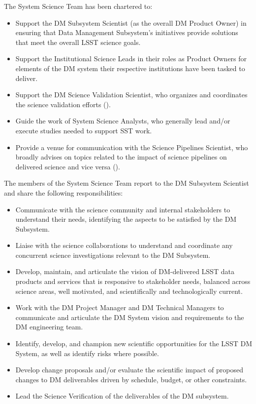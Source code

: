 The System Science Team has been chartered to:
\begin{itemize}
\item Support the DM Subsystem Scientist (as the overall DM Product Owner) in ensuring that Data Management Subsystem's initiatives provide solutions that meet the overall LSST science goals.
\item Support the Institutional Science Leads in their roles as Product Owners for elements of the DM system their respective institutions have been tasked to deliver.
\item Support the DM Science Validation Scientist, who organizes and coordinates the science validation efforts ().
\item Guide the work of System Science Analysts, who generally lead and/or execute studies needed to support SST work.
\item Provide a venue for communication with the Science Pipelines Scientist, who broadly advises on topics related to the impact of science pipelines on delivered science and vice versa ().
\end{itemize}

The members of the System Science Team report to the DM Subsystem Scientist and share the following responsibilities:
\begin{itemize}
\item Communicate with the science community and internal stakeholders to understand their needs, identifying the aspects to be satisfied by the DM Subsystem.
\item Liaise with the science collaborations to understand and coordinate any concurrent science investigations relevant to the DM Subsystem.
\item Develop, maintain, and articulate the vision of DM-delivered LSST data products and services that is responsive to stakeholder needs, balanced across science areas, well motivated, and scientifically and technologically current.
\item Work with the DM Project Manager and DM Technical Managers to communicate and articulate the DM System vision and requirements to the DM engineering team.
\item Identify, develop, and champion new scientific opportunities for the LSST DM System, as well as identify risks where possible.
\item Develop change proposals and/or evaluate the scientific impact of proposed changes to DM deliverables driven by schedule, budget, or other constraints.
\item Lead the Science Verification of the deliverables of the DM subsystem.
\end{itemize}

